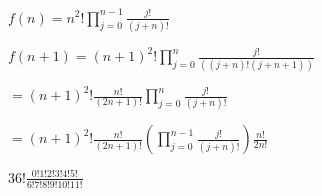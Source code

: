 \documentclass[12pt]{article}
\author{Marie Burer}
\begin{document}
\newpage
\setlength{\parindent}{0pt}

$f(n) = n^{2}! \prod_{j = 0}^{n - 1} \frac{j!}{(j + n)!}$

$f(n + 1) = (n + 1)^{2}! \prod_{j = 0}^{n} \frac{j!}{((j + n)!(j + n + 1))}$

$= (n + 1)^{2}! \frac{n!}{(2n + 1)!} \prod_{j = 0}^{n} \frac{j!}{(j + n)!}$

$= (n + 1)^{2}! \frac{n!}{(2n + 1)!} (\prod_{j = 0}^{n - 1} \frac{j!}{(j + n)!}) \frac{n!}{2n!}$

$36!\frac{0! 1! 2! 3! 4! 5!}{6! 7! 8! 9! 10! 11!}$
\end{document}
